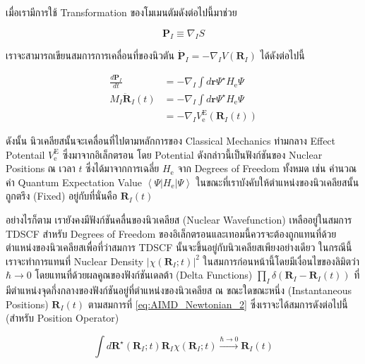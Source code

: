 \noindent เมื่อเรามีการใช้ Transformation ของโมเมนตัมดังต่อไปนี้มาช่วย

\begin{equation}
  \mathbf{P}_I \equiv \nabla_I S
\end{equation}

\noindent เราจะสามารถเขียนสมการการเคลื่อนที่ของนิวตัน $\dot{\mathbf{P}}_I = -\nabla_I V\left(\mathbf{R}_I\right)$
ได้ดังต่อไปนี้

\begin{align}
  \label{eq:AIMD_Newtonian_1}
  \frac{d \mathbf{P}_I}{d t} & =-\nabla_I \int d \mathbf{r} \Psi^{\star} H_{\mathrm{e}} \Psi      \\
  \label{eq:AIMD_Newtonian_2}
  M_I \ddot{\mathbf{R}}_I(t) & =-\nabla_I \int d \mathbf{r} \Psi^{\star} H_{\mathrm{e}} \Psi      \\
  \label{eq:AIMD_Newtonian_3}
                             & =-\nabla_I V_{\mathrm{e}}^{\mathrm{E}}\left(\mathbf{R}_I(t)\right)
\end{align}

ดังนั้น นิวเคลียสนั้นจะเคลื่อนที่ไปตามหลักการของ Classical Mechanics ท่ามกลาง Effect Potentail $V_{\mathrm{e}}^{\mathrm{E}}$
ซึ่งมาจากอิเล็กตรอน โดย Potential ดังกล่าวนี้เป็นฟังก์ชันของ Nuclear Positions ณ เวลา $t$ ซึ่งได้มาจากการเฉลี่ย
$H_{\mathrm{e}}$ จาก Degrees of Freedom ทั้งหมด เช่น คำนวณค่า Quantum Expectation Value
$\left\langle\Psi\left|H_{\mathrm{e}}\right| \Psi\right\rangle$ ในขณะที่เราบังคับให้ตำแหน่งของนิวเคลียสนั้นถูกตรึง (Fixed)
อยู่กับที่นั่นคือ $\mathbf{R}_I(t)$

อย่างไรก็ตาม เรายังคงมีฟังก์ชันคลื่นของนิวเคลียส (Nuclear Wavefunction) เหลืออยู่ในสมการ TDSCF สำหรับ Degrees of Freedom
ของอิเล็กตรอนและเทอมนี้ควรจะต้องถูกแทนที่ด้วยตำแหน่งของนิวเคลียสเพื่อที่ว่าสมการ TDSCF นั้นจะขึ้นอยู่กับนิวเคลียสเพียงอย่างเดียว
ในกรณีนี้เราจะทำการแทนที่ Nuclear Density $\left|\chi\left(\mathbf{R}_I ; t\right)\right|^2$
ในสมการก่อนหน้านี้โดยมีเงื่อนไขของลิมิตว่า $\hbar \rightarrow 0$ โดยแทนที่ด้วยผลคูณของฟังก์ชันเดลต้า (Delta Functions)
$\prod_I \delta\left(\mathbf{R}_I-\mathbf{R}_I(t)\right)$ ที่มีตำแหน่งจุดกึ่งกลางของฟังก์ชันอยู่ที่ตำแหน่งของนิวเคลียส ณ
ขณะใดขณะหนึ่ง (Instantaneous Positions) $\mathbf{R}_I(t)$ ตามสมการที่ \eqref{eq:AIMD_Newtonian_2}
ซึ่งเราจะได้สมการดังต่อไปนี้ (สำหรับ Position Operator)

\begin{equation}
  \int d \mathbf{R}^{\star}\left(\mathbf{R}_I ; t\right) \mathbf{R}_I \chi\left(\mathbf{R}_I ; t\right)
  \stackrel{\hbar \rightarrow 0}{\longrightarrow}
  \mathbf{R}_I(t)
\end{equation}

